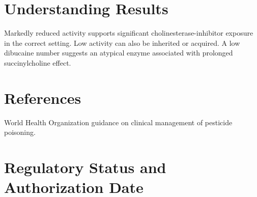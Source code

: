 \section*{Understanding Results}
Markedly reduced activity supports significant cholinesterase-inhibitor exposure in the correct setting. Low activity can also be inherited or acquired. A low dibucaine number suggests an atypical enzyme associated with prolonged succinylcholine effect.

\section*{References}
World Health Organization guidance on clinical management of pesticide poisoning.

\clearpage


\section*{Regulatory Status and Authorization Date}

\clearpage
